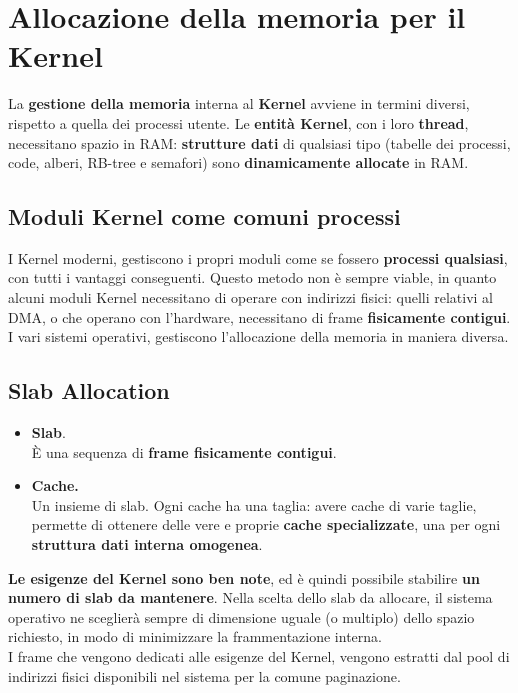 \documentclass{report}
\begin{document}
\newpage

\section{Allocazione della memoria per il Kernel}
La \textbf{gestione della memoria} interna al \textbf{Kernel} avviene in termini diversi, rispetto a quella dei processi utente. Le \textbf{entità Kernel}, con i loro \textbf{thread}, necessitano spazio in RAM: \textbf{strutture dati} di qualsiasi tipo (tabelle dei processi, code, alberi, RB-tree e semafori) sono \textbf{dinamicamente allocate} in RAM. 

\subsection{Moduli Kernel come comuni processi}
I Kernel moderni, gestiscono i propri moduli come se fossero \textbf{processi qualsiasi}, con tutti i vantaggi conseguenti. Questo metodo non è sempre viable, in quanto alcuni moduli Kernel necessitano di operare con indirizzi fisici: quelli relativi al DMA, o che operano con l'hardware, necessitano di frame \textbf{fisicamente contigui}. I vari sistemi operativi, gestiscono l'allocazione della memoria in maniera diversa.

\subsection{Slab Allocation}

\begin{itemize}
    \item \textbf{Slab}.\\
    È una sequenza di \textbf{frame fisicamente contigui}.
    \item \textbf{Cache.}\\
    Un insieme di slab. Ogni cache ha una taglia: avere cache di varie taglie, permette di ottenere delle vere e proprie \textbf{cache specializzate}, una per ogni \textbf{struttura dati interna omogenea}.
\end{itemize}

\textbf{Le esigenze del Kernel sono ben note}, ed è quindi possibile stabilire \textbf{un numero di slab da mantenere}. Nella scelta dello slab da allocare, il sistema operativo ne sceglierà sempre di dimensione uguale (o multiplo) dello spazio richiesto, in modo di minimizzare la frammentazione interna.\\
I frame che vengono dedicati alle esigenze del Kernel, vengono estratti dal pool di indirizzi fisici disponibili nel sistema per la comune paginazione.
\end{document}
